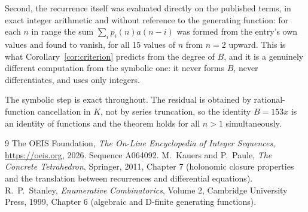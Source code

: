 \documentclass[11pt,a4paper]{article}
\theoremstyle{plain}
\theoremstyle{definition}
\begin{document}
Second, the recurrence itself was evaluated directly on the published terms, in exact
integer arithmetic and without reference to the generating function: for each $n$ in range
the sum $\sum_{i}p_{i}(n)a(n-i)$ was formed from the entry's own values and found to
vanish, for all 15 values of $n$ from $n=2$ upward. This is what
Corollary~\ref{cor:criterion} predicts from the degree of $B$, and it is a genuinely
different computation from the symbolic one: it never forms $B$, never differentiates, and
uses only integers.

The symbolic step is exact throughout. The residual is obtained by rational-function
cancellation in $K$, not by series truncation, so the identity $B=153 x$ is an
identity of functions and the theorem holds for all $n>1$ simultaneously.

\begin{thebibliography}{9}
 The OEIS Foundation, \emph{The On-Line Encyclopedia of Integer Sequences},
\url{https://oeis.org}, 2026. Sequence A064092.
 M.~Kauers and P.~Paule, \emph{The Concrete Tetrahedron}, Springer, 2011,
Chapter 7 (holonomic closure properties and the translation between recurrences and
differential equations).
 R.~P.~Stanley, \emph{Enumerative Combinatorics}, Volume 2, Cambridge
University Press, 1999, Chapter 6 (algebraic and D-finite generating functions).
\end{thebibliography}
\end{document}
